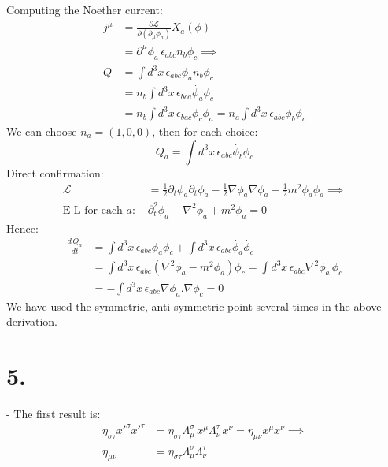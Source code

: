 \documentclass{article}
\newcommand{\pd}{\partial}  %
\newcommand{\pdm}{\partial_\mu}  %
\newcommand{\pdup}{\partial^\mu}  %
\newcommand{\Lag}{\mathcal{L}}  %
\newcommand{\onehalf}{\frac{1}{2}}
\begin{document}
Computing the Noether current:
\begin{equation}
    \begin{split}
        j^\mu & = \frac{\pd\Lag}{\pd(\pdm \phi_a)}X_a(\phi) \\
        & = \pdup\phi_a \, \epsilon_{abc}n_b\phi_c \implies \\
        Q & = \int d^3x \, \epsilon_{abc} \dot{\phi_a} n_b \phi_c \\
        & =  n_b \int d^3x \,\epsilon_{bca} \dot{\phi_a} \phi_c \\ 
        & = n_b \int d^3x \, \epsilon_{bac} \dot{\phi_c} \phi_a = n_a \int d^3x \, 
        \epsilon_{abc} \dot{\phi_b} \phi_c 
    \end{split}
\end{equation}
We can choose $n_a = (1,0,0)$, then for each choice:
\begin{equation}
    Q_a = \int d^3x \, 
    \epsilon_{abc} \dot{\phi_b} \phi_c 
\end{equation}
Direct confirmation:
\begin{equation}
    \begin{split}
        \Lag & = \onehalf\pd_t\phi_a\pd_t\phi_a - \onehalf\nabla \phi_a\nabla\phi_a-\onehalf m^2\phi_a\phi_a \implies \\
        \text{E-L for each $a$: } & \pd_t^2 \phi_a - \nabla^2\phi_a + m^2\phi_a = 0 
    \end{split}
\end{equation} 
Hence:
\begin{equation}
    \begin{split}
        \frac{d \, Q_a}{dt} & = \int d^3x \, \epsilon_{abc}\ddot{\phi_a}\phi_c + \int  
        d^3x \, \epsilon_{abc}\dot{\phi_a}\dot{\phi_c}  \\
        & = \int d^3x \, \epsilon_{abc}(\nabla^2 \phi_a - m^2\phi_a)\phi_c = 
         \int d^3x \, \epsilon_{abc} \nabla^2 \phi_a \, \phi_c \\
         & = - \int d^3x \, \epsilon_{abc} \nabla\phi_a.\nabla\phi_c = 0
    \end{split}
\end{equation}
We have used the symmetric, anti-symmetric point several times in the above derivation.


\section*{5.}
- The first result is:
\begin{equation}
    \begin{split}
    \eta_{\sigma\tau}x'^\sigma x'^{\tau} & = \eta_{\sigma\tau}\Lambda_\mu^\sigma \, x^\mu \Lambda^\tau_\nu \, x^\nu = \eta_{\mu\nu}x^\mu x^\nu \implies \\
    \eta_{\mu\nu} & = \eta_{\sigma\tau}\Lambda_\mu^\sigma \Lambda^\tau_\nu
    \end{split}
\end{equation}
\end{document}
